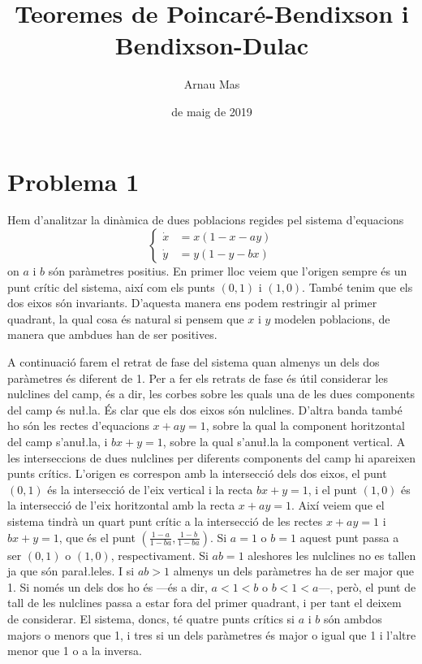 \documentclass[12pt]{article}
\title{\sffamily {\bfseries Seminari 2:} {\sffamily Teoremes de Poincaré-Bendixson i Bendixson-Dulac}}
\author{\sffamily Arnau Mas}
\date{\sffamily 16 de maig de 2019}
\numberwithin{table}{section}
\numberwithin{equation}{section}
\numberwithin{figure}{section}
\begin{document}
\maketitle

\addtocounter{section}{1}
\section*{Problema 1}
Hem d'analitzar la dinàmica de dues poblacions regides pel sistema d'equacions 
\begin{equation} \label{eqn:dinàmica de poblacions}
	\left\{
		\begin{aligned}
			\dot{x} &= x(1 - x - ay) \\
			\dot{y} &= y(1 - y - bx)
		\end{aligned}
	\right.
\end{equation}
on \( a \) i \( b \) són paràmetres positius. En primer lloc veiem que l'origen sempre és un punt crític del sistema, així com els punts \( (0,1) \) i \( (1,0) \). També tenim que els dos eixos són invariants. D'aquesta manera ens podem restringir al primer quadrant, la qual cosa és natural si pensem que \( x \) i \( y \) modelen poblacions, de manera que ambdues han de ser positives.   

A continuació farem el retrat de fase del sistema quan almenys un dels dos paràmetres és diferent de 1. Per a fer els retrats de fase és útil considerar les nulclines del camp, és a dir, les corbes sobre les quals una de les dues components del camp és nu\l.la. És clar que els dos eixos són nulclines. D'altra banda també ho són les rectes d'equacions \( x + ay = 1 \), sobre la qual la component horitzontal del camp s'anu\l.la, i \( bx + y = 1 \), sobre la qual s'anu\l.la la component vertical. A les interseccions de dues nulclines per diferents components del camp hi apareixen punts crítics. L'origen es correspon amb la intersecció dels dos eixos, el punt \( (0,1) \) és la intersecció de l'eix vertical i la recta \( bx + y = 1 \), i el punt \( (1,0) \) és la intersecció de l'eix horitzontal amb la recta \( x + ay = 1 \). Així veiem que el sistema tindrà un quart punt crític a la intersecció de les rectes \( x + ay = 1 \) i \( bx + y = 1 \), que és el punt \( \left(\frac{1 - a}{1 - ba}, \frac{1 - b}{1 - ba}\right) \). Si \( a = 1 \) o \( b = 1 \) aquest punt passa a ser \( (0,1) \) o \( (1,0) \), respectivament. Si \( ab = 1 \) aleshores les nulclines no es tallen ja que són para\l.leles. I si \( ab > 1 \) almenys un dels paràmetres ha de ser major que 1. Si només un dels dos ho és ---és a dir, \( a < 1 < b \) o \( b < 1 < a \)---, però, el punt de tall de les nulclines passa a estar fora del primer quadrant, i per tant el deixem de considerar.  El sistema, doncs, té quatre punts crítics si \( a \) i \( b \) són ambdos majors o menors que 1, i tres si un dels paràmetres és major o igual que 1 i l'altre menor que 1 o a la inversa. 
\end{document}
